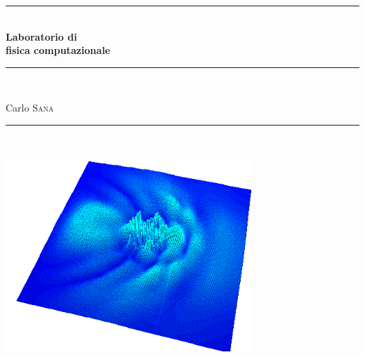 \newcommand{\HRule}{\rule{\linewidth}{0.5mm}}
\begin{titlepage}
 \begin{center}
  \HRule \\[0.4cm]
{ \huge \bfseries Laboratorio di \\
fisica computazionale}\\[0.4cm]
\HRule \\[1cm]
\begin{flushleft} \Large
Carlo \textsc{Sana}
\end{flushleft}
\HRule \\[1cm]
\begin{flushright}
\includegraphics[width=0.7\textwidth,]{title.png}
\end{flushright}

\end{center}

\end{titlepage}
